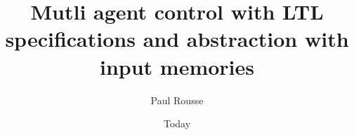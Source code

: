 \documentclass[electronic]{kthesis}
\newcommand{\vect}[1]{\ensuremath{ \mathbf{#1}}}
\theoremstyle{named}
\begin{document}
\title{Mutli agent control with LTL specifications and abstraction with input memories}
\subtitle{}
\author{Paul Rousse}
\date{Today}
\imprint{}
\disputationsdatum{}
\disputationslokal{}
\publisher{}
\examen{}

\frontmatter

\maketitle

\tableofcontents

\mainmatter 



\newcommand{\SSunobs}{\mathfrak{X}^i}
\newcommand{\SSobs}{\mathfrak{X}^o}
\newcommand{\Ninputs}{\Delta n_u}%
\newcommand{\y}{\vect{y}}%
\newcommand{\x}{\vect{x}}%
\newcommand{\xa}{\vect{x}^a}%
\newcommand{\xobs}{\vect{x}^o}%
\newcommand{\Xobs}{X^o}%
\newcommand{\Xobsinit}{X^o_0}%
\newcommand{\xunobs}{\vect{x}^i}%
\newcommand{\Xunobs}{X^i}%
\newcommand{\Sunobs}{\mathcal{S}^i}%
\newcommand{\Xuinv}{{\mathcal{X}^i}}%
\newcommand{\pastuseq}{\vect{u}_{n-\Ninputs},\dots,\vect{u}_{n-1}}%
\newcommand{\pastuseqn}{\vect{u}_{n+1-\Ninputs},\dots,\vect{u}_{n}}%
\newcommand{\Pastuseq}{U_n}%
\newcommand{\sys}{\mathcal{S}}%
\newcommand{\sysa}{\mathcal{S}_a}%
\newcommand{\sysaU}{\mathcal{U}}%
\newcommand{\sysA}{\mathcal{S}_A}%
\newcommand{\sysB}{\mathcal{S}_B}%
\newcommand{\sysC}{\mathcal{S}_C}%
\newcommand{\Usys}{\mathcal{U}}%
\newcommand{\Wsys}{\mathcal{W}}%
\newcommand{\Uunobs}{{\mathcal{U}^i}}%
\newcommand{\Wunobs}{{\mathcal{W}^i}}%
\newcommand{\uobs}{\vect{u}^o}%
\newcommand{\wobs}{\vect{w}^o}%
\newcommand{\uunobs}{\vect{u}^i}%
\newcommand{\wunobs}{\vect{w}^i}%
\newcommand{\Dunobs}{n^i}%
\newcommand{\R}{\mathbb{R}}%
\newcommand{\mle}{\prec}
\newcommand{\mleq}{\preceq}
\newcommand{\minf}[1]{\underline{#1}}
\newcommand{\msup}[1]{\overline{#1}}
\newcommand{\X}{X}%
\newcommand{\Xinv}{\mathcal{X}}%
\newcommand{\U}{\mathcal{U}}%
\newcommand{\W}{\mathcal{W}}%
\newcommand{\vu}{\vect{u}}%
\renewcommand{\u}{\vect{u}}%
\renewcommand{\U}{\mathcal{U}}%
\newcommand{\w}{\vect{w}}%
\newcommand{\s}{\vect{s}}%
\newcommand{\st}{\vect{t}}%
%
\newcommand{\traj}{\varphi}
%
\newcommand{\xd}{\x_d}
\newcommand{\vd}{\vect{v}_d}
\newcommand{\Nobs}{N^o} %
%
\newcommand{\dt}{dT}%
\end{document}
